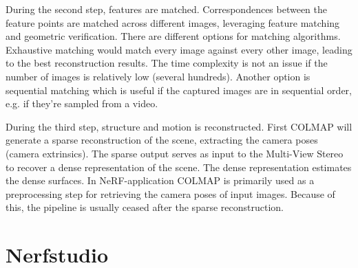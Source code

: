 During the second step, features are matched. Correspondences between the feature points are matched across different images, leveraging feature matching and geometric verification. There are different options for matching algorithms. Exhaustive matching would match every image against every other image, leading to the best reconstruction results. The time complexity is not an issue if the number of images is relatively low (several hundreds). Another option is sequential matching which is useful if the captured images are in sequential order, e.g. if they're sampled from a video.

During the third step, structure and motion is reconstructed. First COLMAP will generate a sparse reconstruction of the scene, extracting the camera poses (camera extrinsics). The sparse output serves as input to the Multi-View Stereo to recover a dense representation of the scene. The dense representation estimates the dense surfaces. In NeRF-application COLMAP is primarily used as a preprocessing step for retrieving the camera poses of input images. Because of this, the pipeline is usually ceased after the sparse reconstruction.



\begin{comment}
Exhaustive matching:
time complexity: O(n^2), where n is the number of images
memory complexity: O(n) for storing all images, O(n^2) for storing the results of the matching process

Sequential matching:
time complexity: O(n * k), where n is the number of images and k is the number of adjacent images each image is matched against
memory complexity: O(n * k)

Vocabulary tree-based matching:
time complexity: O(n^2), assuming that the size of the vocabulary tree is constant and not a function of the number n of images
memory complexity: O(n * k), where k is the number of top-retrieved images that each image is matched against
There is definitively literature on the topic of the time and memory complexity of vocabulary tree-based matching and image retrieval
\end{comment}

\section{Nerfstudio} \label{sec:nerfstudio}

